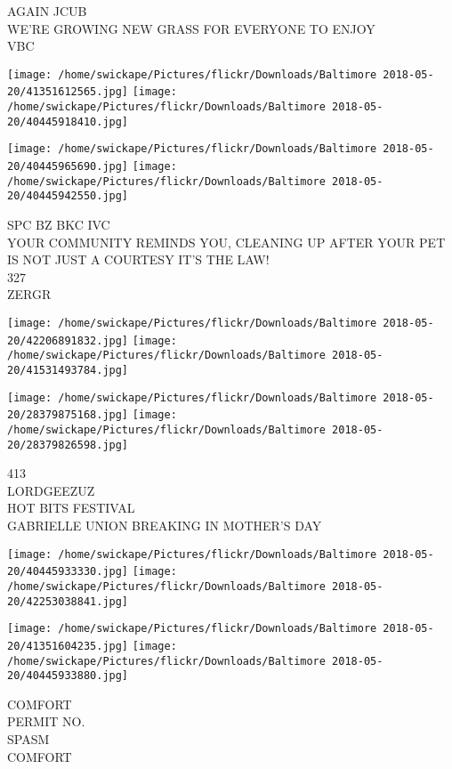 \documentclass[10pt,letterpaper]{article}
\begin{document}
AGAIN JCUB\\
WE'RE GROWING NEW GRASS FOR EVERYONE TO ENJOY\\
VBC\\
\pagebreak

\texttt{[image: /home/swickape/Pictures/flickr/Downloads/Baltimore 2018-05-20/41351612565.jpg]}
\texttt{[image: /home/swickape/Pictures/flickr/Downloads/Baltimore 2018-05-20/40445918410.jpg]}

\texttt{[image: /home/swickape/Pictures/flickr/Downloads/Baltimore 2018-05-20/40445965690.jpg]}
\texttt{[image: /home/swickape/Pictures/flickr/Downloads/Baltimore 2018-05-20/40445942550.jpg]}

SPC BZ BKC IVC\\
YOUR COMMUNITY REMINDS YOU, CLEANING UP AFTER YOUR PET IS NOT JUST A COURTESY IT'S THE LAW!\\
327\\
ZERGR\\
\pagebreak

\texttt{[image: /home/swickape/Pictures/flickr/Downloads/Baltimore 2018-05-20/42206891832.jpg]}
\texttt{[image: /home/swickape/Pictures/flickr/Downloads/Baltimore 2018-05-20/41531493784.jpg]}

\texttt{[image: /home/swickape/Pictures/flickr/Downloads/Baltimore 2018-05-20/28379875168.jpg]}
\texttt{[image: /home/swickape/Pictures/flickr/Downloads/Baltimore 2018-05-20/28379826598.jpg]}

413\\
LORDGEEZUZ\\
HOT BITS FESTIVAL\\
GABRIELLE UNION BREAKING IN MOTHER'S DAY\\
\pagebreak

\texttt{[image: /home/swickape/Pictures/flickr/Downloads/Baltimore 2018-05-20/40445933330.jpg]}
\texttt{[image: /home/swickape/Pictures/flickr/Downloads/Baltimore 2018-05-20/42253038841.jpg]}

\texttt{[image: /home/swickape/Pictures/flickr/Downloads/Baltimore 2018-05-20/41351604235.jpg]}
\texttt{[image: /home/swickape/Pictures/flickr/Downloads/Baltimore 2018-05-20/40445933880.jpg]}

COMFORT\\
PERMIT NO.\\
SPASM\\
COMFORT\\
\pagebreak
\end{document}
